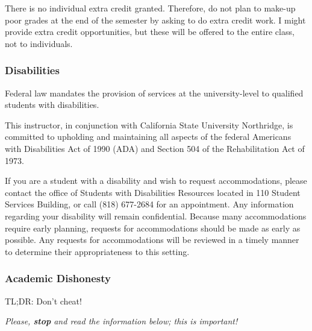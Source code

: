 \documentclass[
  letterpaper,
  DIV=11,
  numbers=noendperiod]{scrartcl}
\begin{document}
There is no individual extra credit granted. Therefore, do not plan to
make-up poor grades at the end of the semester by asking to do extra
credit work. I might provide extra credit opportunities, but these will
be offered to the entire class, not to individuals.

\hypertarget{sec-disabilities}{%
\subsubsection{Disabilities}\label{sec-disabilities}}

Federal law mandates the provision of services at the university-level
to qualified students with disabilities.

This instructor, in conjunction with California State University
Northridge, is committed to upholding and maintaining all aspects of the
federal Americans with Disabilities Act of 1990 (ADA) and Section 504 of
the Rehabilitation Act of 1973.

If you are a student with a disability and wish to request
accommodations, please contact the office of Students with Disabilities
Resources located in 110 Student Services Building, or call (818)
677-2684 for an appointment. Any information regarding your disability
will remain confidential. Because many accommodations require early
planning, requests for accommodations should be made as early as
possible. Any requests for accommodations will be reviewed in a timely
manner to determine their appropriateness to this setting.

\hypertarget{dishonesty}{%
\subsubsection{Academic Dishonesty}\label{dishonesty}}

TL;DR: Don't cheat!

\emph{Please, \textbf{stop} and read the information below; this is
important!}
\end{document}
